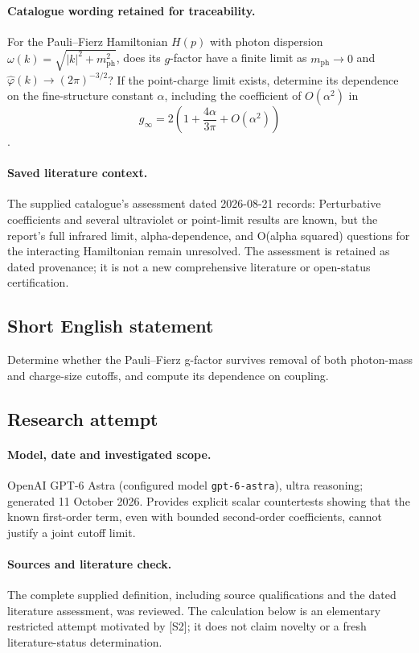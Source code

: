\documentclass[11pt]{article}
\begin{document}
\paragraph{Catalogue wording retained for traceability.}
For the Pauli–Fierz Hamiltonian $H(p)$ with photon dispersion $\omega(k)=\sqrt{|k|^2+m_{\mathrm{ph}}^2}$, does its $g$-factor have a finite limit as $m_{\mathrm{ph}}\to0$ and $\widehat\varphi(k)\to(2\pi)^{-3/2}$? If the point-charge limit exists, determine its dependence on the fine-structure constant $\alpha$, including the coefficient of $O(\alpha^2)$ in $$g_\infty=2\left(1+\frac{4\alpha}{3\pi}+O(\alpha^2)\right)$$.

\paragraph{Saved literature context.} The supplied catalogue's assessment dated 2026-08-21 records: Perturbative coefficients and several ultraviolet or point-limit results are known, but the report's full infrared limit, alpha-dependence, and O(alpha squared) questions for the interacting Hamiltonian remain unresolved. The assessment is retained as dated provenance; it is not a new comprehensive literature or open-status certification.
\subsection{Short English statement}
Determine whether the Pauli--Fierz g-factor survives removal of both photon-mass and charge-size cutoffs, and compute its dependence on coupling.
\subsection{Research attempt}
\paragraph{Model, date and investigated scope.}
OpenAI GPT-6 Astra (configured model \texttt{gpt-6-astra}), ultra reasoning; generated 11 October 2026. Provides explicit scalar countertests showing that the known first-order term, even with bounded second-order coefficients, cannot justify a joint cutoff limit.

\paragraph{Sources and literature check.}
The complete supplied definition, including source qualifications and the dated literature assessment, was reviewed. The calculation below is an elementary restricted attempt motivated by [S2]; it does not claim novelty or a fresh literature-status determination.
\end{document}
